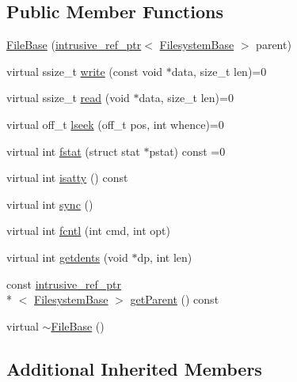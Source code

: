 \subsection*{Public Member Functions}
\begin{DoxyCompactItemize}
\item 
\hyperlink{classmiosix_1_1_file_base_ac2d9b02c994abc845bff1007ab5d5266}{File\-Base} (\hyperlink{classmiosix_1_1intrusive__ref__ptr}{intrusive\-\_\-ref\-\_\-ptr}$<$ \hyperlink{classmiosix_1_1_filesystem_base}{Filesystem\-Base} $>$ parent)
\item 
virtual ssize\-\_\-t \hyperlink{classmiosix_1_1_file_base_a81ce4c4c059767a23625acdc3223a27d}{write} (const void $\ast$data, size\-\_\-t len)=0
\item 
virtual ssize\-\_\-t \hyperlink{classmiosix_1_1_file_base_a89159ade6da3c9a183646b57ea8799fd}{read} (void $\ast$data, size\-\_\-t len)=0
\item 
virtual off\-\_\-t \hyperlink{classmiosix_1_1_file_base_ae5b8dee32e80dd804c2cb657d9ad0cfc}{lseek} (off\-\_\-t pos, int whence)=0
\item 
virtual int \hyperlink{classmiosix_1_1_file_base_ac1874a6f08cae88d52844d6ba7e1d1da}{fstat} (struct stat $\ast$pstat) const =0
\item 
virtual int \hyperlink{classmiosix_1_1_file_base_a2bedafef2ca811d26ec5a83897b75934}{isatty} () const 
\item 
virtual int \hyperlink{classmiosix_1_1_file_base_a80d4260e58c71125d3dcfa98350c41da}{sync} ()
\item 
virtual int \hyperlink{classmiosix_1_1_file_base_aa30007f86e2b02875942fed1f5c845e2}{fcntl} (int cmd, int opt)
\item 
virtual int \hyperlink{classmiosix_1_1_file_base_ac06d6bfddbe8399ac15584ea54175a67}{getdents} (void $\ast$dp, int len)
\item 
const \hyperlink{classmiosix_1_1intrusive__ref__ptr}{intrusive\-\_\-ref\-\_\-ptr}\\*
$<$ \hyperlink{classmiosix_1_1_filesystem_base}{Filesystem\-Base} $>$ \hyperlink{classmiosix_1_1_file_base_aefd996e71e395cabc9cc08294b6e6a25}{get\-Parent} () const 
\item 
virtual \hyperlink{classmiosix_1_1_file_base_a8f7079b5d9b4a936856f7308ce064532}{$\sim$\-File\-Base} ()
\end{DoxyCompactItemize}
\subsection*{Additional Inherited Members}


